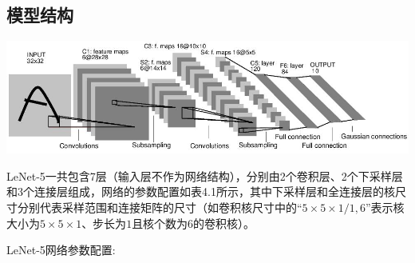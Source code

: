\documentclass[12pt,a4paper,UTF8,twoside]{book}
\begin{document}
\hypertarget{ux6a21ux578bux7ed3ux6784}{%
\subsection{模型结构}\label{ux6a21ux578bux7ed3ux6784}}

\begin{center}\includegraphics[width=0.7\linewidth]{img/02-01} \end{center}

LeNet-5一共包含7层（输入层不作为网络结构），分别由2个卷积层、2个下采样层和3个连接层组成，网络的参数配置如表4.1所示，其中下采样层和全连接层的核尺寸分别代表采样范围和连接矩阵的尺寸（如卷积核尺寸中的\(“5\times5\times1/1,6”\)表示核大小为\(5\times5\times1\)、步长为\(1\)且核个数为6的卷积核）。

LeNet-5网络参数配置:
\end{document}

